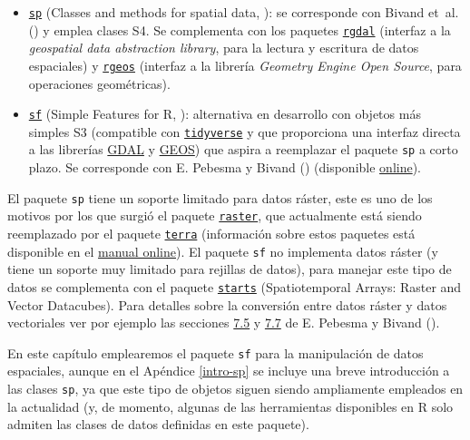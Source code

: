 \documentclass[
]{book}
\theoremstyle{break}
\theoremstyle{definition}
\theoremstyle{definition}
\theoremstyle{definition}
\theoremstyle{definition}
\theoremstyle{remark}
\begin{document}
\begin{itemize}
\item
  \href{https://CRAN.R-project.org/package=sp}{\texttt{sp}} (Classes and methods for spatial data, ): se corresponde con Bivand et~al. () y emplea clases S4. Se complementa con los paquetes \href{https://CRAN.R-project.org/package=rgdal}{\texttt{rgdal}} (interfaz a la \emph{geospatial data abstraction library}, para la lectura y escritura de datos espaciales) y \href{https://CRAN.R-project.org/package=rgeos}{\texttt{rgeos}} (interfaz a la librería \emph{Geometry Engine Open Source}, para operaciones geométricas).
\item
  \href{https://r-spatial.github.io/sf}{\texttt{sf}} (Simple Features for R, ): alternativa en desarrollo con objetos más simples S3 (compatible con \href{http://tidyverse.org}{\texttt{tidyverse}} y que proporciona una interfaz directa a las librerías \href{https://gdal.org}{GDAL} y \href{https://trac.osgeo.org/geos}{GEOS}) que aspira a reemplazar el paquete \texttt{sp} a corto plazo. Se corresponde con E. Pebesma y Bivand () (disponible \href{https://keen-swartz-3146c4.netlify.app}{online}).
\end{itemize}

El paquete \texttt{sp} tiene un soporte limitado para datos ráster, este es uno de los motivos por los que surgió el paquete \href{https://CRAN.R-project.org/package=raster}{\texttt{raster}}, que actualmente está siendo reemplazado por el paquete \href{https://CRAN.R-project.org/package=terra}{\texttt{terra}} (información sobre estos paquetes está disponible en el \href{https://rspatial.org/}{manual online}).
El paquete \texttt{sf} no implementa datos ráster (y tiene un soporte muy limitado para rejillas de datos), para manejar este tipo de datos se complementa con el paquete \href{https://r-spatial.github.io/stars}{\texttt{starts}} (Spatiotemporal Arrays: Raster and Vector Datacubes).
Para detalles sobre la conversión entre datos ráster y datos vectoriales ver por ejemplo las secciones \href{https://keen-swartz-3146c4.netlify.app/sf.html\#raster-to-vector}{7.5} y \href{https://keen-swartz-3146c4.netlify.app/sf.html\#warp}{7.7} de E. Pebesma y Bivand ().

En este capítulo emplearemos el paquete \texttt{sf} para la manipulación de datos espaciales, aunque en el Apéndice \ref{intro-sp} se incluye una breve introducción a las clases \texttt{sp}, ya que este tipo de objetos siguen siendo ampliamente empleados en la actualidad (y, de momento, algunas de las herramientas disponibles en R solo admiten las clases de datos definidas en este paquete).
\end{document}
